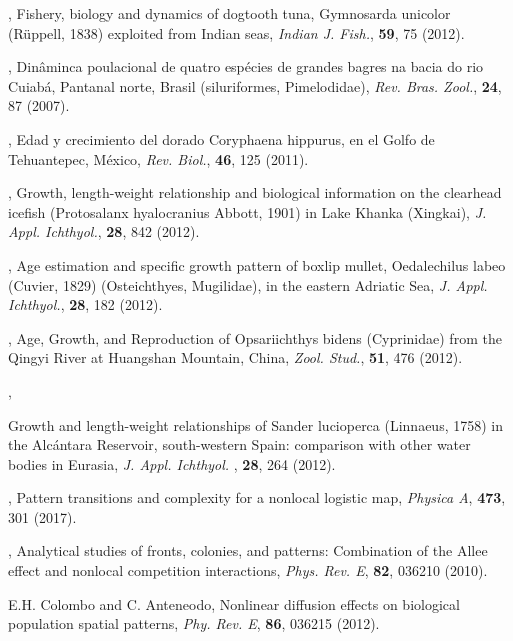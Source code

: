 \documentclass[10pt]{iopart}
\begin{document}
\begin{thebibliography}{100}
, {Fishery, biology and dynamics of dogtooth tuna, Gymnosarda unicolor (Rüppell, 1838) exploited from Indian seas}, \textit{Indian J. Fish.}, \textbf{59}, {75} {(2012)}.

, {Din\^{a}minca poulacional de quatro esp\'{e}cies de grandes bagres na bacia do rio Cuiab\'{a}, Pantanal norte, Brasil (siluriformes, Pimelodidae)}, \textit{ Rev. Bras. Zool.}, \textbf{24}, 87 {(2007)}.

, {Edad y crecimiento del dorado Coryphaena hippurus, en el Golfo de Tehuantepec, México}, \textit{Rev. Biol.}, \textbf{46}, 125 {(2011)}.

, {Growth, length-weight relationship and biological information on the clearhead icefish (Protosalanx hyalocranius Abbott, 1901) in Lake Khanka (Xingkai)}, \textit{J. Appl. Ichthyol.}, \textbf{28}, 842 {(2012)}.

, {Age estimation and specific growth pattern of boxlip mullet, Oedalechilus labeo (Cuvier, 1829) (Osteichthyes, Mugilidae), in the eastern Adriatic Sea}, \textit{J. Appl. Ichthyol.}, \textbf{28}, 182 (2012).

, {Age, Growth, and Reproduction of Opsariichthys bidens    (Cyprinidae) from the Qingyi River at Huangshan Mountain, China}, \textit{Zool. Stud.}, \textbf{51}, 476 {(2012)}.

, {Growth and length-weight relationships of Sander lucioperca (Linnaeus, 1758) in the Alc{\'{a}ntara Reservoir, south-western Spain: comparison with other water bodies in Eurasia}, \textit{J. Appl. Ichthyol. }, \textbf{28}, 264 {(2012)}.

, {Pattern transitions and complexity for a nonlocal logistic map}, \textit{Physica A}, \textbf{473}, {301} {(2017)}.

, {Analytical studies of fronts, colonies, and patterns: Combination of the Allee effect and nonlocal competition interactions}, \textit{Phys. Rev. E}, \textbf{82}, {036210} {(2010)}.

 {E.H. Colombo and C. Anteneodo}, {Nonlinear diffusion effects on biological population spatial patterns},  \textit{Phy. Rev. E}, \textbf{86}, 036215 (2012). 

}
\end{thebibliography}
\end{document}
